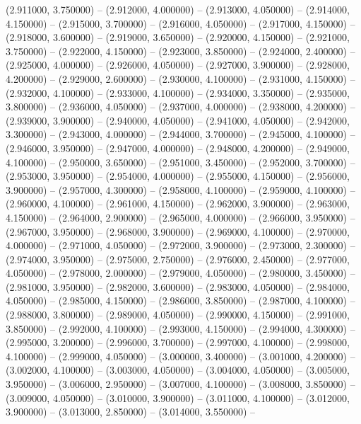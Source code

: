 (2.911000, 3.750000) -- 
(2.912000, 4.000000) -- 
(2.913000, 4.050000) -- 
(2.914000, 4.150000) -- 
(2.915000, 3.700000) -- 
(2.916000, 4.050000) -- 
(2.917000, 4.150000) -- 
(2.918000, 3.600000) -- 
(2.919000, 3.650000) -- 
(2.920000, 4.150000) -- 
(2.921000, 3.750000) -- 
(2.922000, 4.150000) -- 
(2.923000, 3.850000) -- 
(2.924000, 2.400000) -- 
(2.925000, 4.000000) -- 
(2.926000, 4.050000) -- 
(2.927000, 3.900000) -- 
(2.928000, 4.200000) -- 
(2.929000, 2.600000) -- 
(2.930000, 4.100000) -- 
(2.931000, 4.150000) -- 
(2.932000, 4.100000) -- 
(2.933000, 4.100000) -- 
(2.934000, 3.350000) -- 
(2.935000, 3.800000) -- 
(2.936000, 4.050000) -- 
(2.937000, 4.000000) -- 
(2.938000, 4.200000) -- 
(2.939000, 3.900000) -- 
(2.940000, 4.050000) -- 
(2.941000, 4.050000) -- 
(2.942000, 3.300000) -- 
(2.943000, 4.000000) -- 
(2.944000, 3.700000) -- 
(2.945000, 4.100000) -- 
(2.946000, 3.950000) -- 
(2.947000, 4.000000) -- 
(2.948000, 4.200000) -- 
(2.949000, 4.100000) -- 
(2.950000, 3.650000) -- 
(2.951000, 3.450000) -- 
(2.952000, 3.700000) -- 
(2.953000, 3.950000) -- 
(2.954000, 4.000000) -- 
(2.955000, 4.150000) -- 
(2.956000, 3.900000) -- 
(2.957000, 4.300000) -- 
(2.958000, 4.100000) -- 
(2.959000, 4.100000) -- 
(2.960000, 4.100000) -- 
(2.961000, 4.150000) -- 
(2.962000, 3.900000) -- 
(2.963000, 4.150000) -- 
(2.964000, 2.900000) -- 
(2.965000, 4.000000) -- 
(2.966000, 3.950000) -- 
(2.967000, 3.950000) -- 
(2.968000, 3.900000) -- 
(2.969000, 4.100000) -- 
(2.970000, 4.000000) -- 
(2.971000, 4.050000) -- 
(2.972000, 3.900000) -- 
(2.973000, 2.300000) -- 
(2.974000, 3.950000) -- 
(2.975000, 2.750000) -- 
(2.976000, 2.450000) -- 
(2.977000, 4.050000) -- 
(2.978000, 2.000000) -- 
(2.979000, 4.050000) -- 
(2.980000, 3.450000) -- 
(2.981000, 3.950000) -- 
(2.982000, 3.600000) -- 
(2.983000, 4.050000) -- 
(2.984000, 4.050000) -- 
(2.985000, 4.150000) -- 
(2.986000, 3.850000) -- 
(2.987000, 4.100000) -- 
(2.988000, 3.800000) -- 
(2.989000, 4.050000) -- 
(2.990000, 4.150000) -- 
(2.991000, 3.850000) -- 
(2.992000, 4.100000) -- 
(2.993000, 4.150000) -- 
(2.994000, 4.300000) -- 
(2.995000, 3.200000) -- 
(2.996000, 3.700000) -- 
(2.997000, 4.100000) -- 
(2.998000, 4.100000) -- 
(2.999000, 4.050000) -- 
(3.000000, 3.400000) -- 
(3.001000, 4.200000) -- 
(3.002000, 4.100000) -- 
(3.003000, 4.050000) -- 
(3.004000, 4.050000) -- 
(3.005000, 3.950000) -- 
(3.006000, 2.950000) -- 
(3.007000, 4.100000) -- 
(3.008000, 3.850000) -- 
(3.009000, 4.050000) -- 
(3.010000, 3.900000) -- 
(3.011000, 4.100000) -- 
(3.012000, 3.900000) -- 
(3.013000, 2.850000) -- 
(3.014000, 3.550000) -- 
